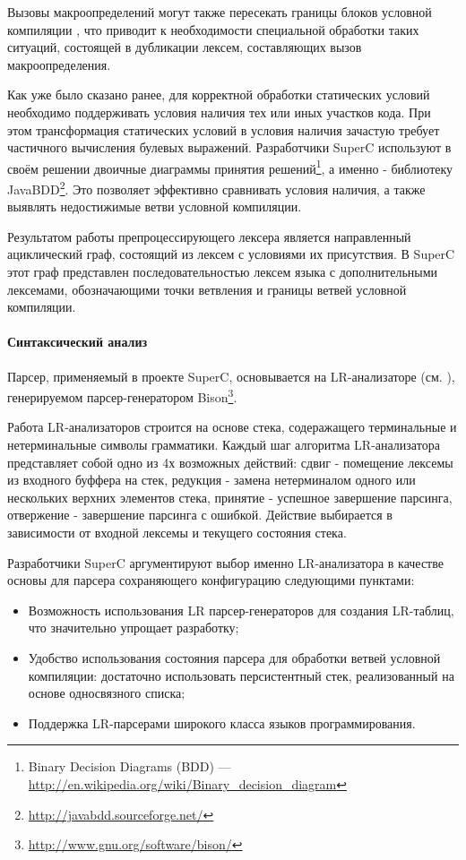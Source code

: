 Вызовы макроопределений могут также пересекать границы блоков условной компиляции , что приводит к необходимости специальной обработки таких ситуаций, состоящей в дубликации лексем, составляющих вызов макроопределения.

Как уже было сказано ранее, для корректной обработки статических условий необходимо поддерживать условия наличия тех или иных участков кода. При этом трансформация статических условий в условия наличия зачастую требует частичного вычисления булевых выражений. Разработчики SuperC используют в своём решении двоичные диаграммы принятия решений\footnote{Binary Decision Diagrams (BDD) --- \url{http://en.wikipedia.org/wiki/Binary\_decision\_diagram}}, а именно - библиотеку JavaBDD\footnote{\url{http://javabdd.sourceforge.net/}}. Это позволяет эффективно сравнивать условия наличия, а также выявлять недостижимые ветви условной компиляции. 

Результатом работы препроцессирующего лексера является направленный ациклический граф, состоящий из лексем с условиями их присутствия. В SuperC этот граф представлен последовательностью лексем языка с дополнительными лексемами, обозначающими точки ветвления и границы ветвей условной компиляции.

\paragraph{Синтаксический анализ}

Парсер, применяемый в проекте SuperC, основывается на LR-анализаторе (см. \cite{aho}), генерируемом парсер-генератором Bison\footnote{\url{http://www.gnu.org/software/bison/}}.

Работа LR-анализаторов строится на основе стека, содеражащего терминальные и нетерминальные символы грамматики. Каждый шаг алгоритма LR-анализатора представляет собой одно из 4х возможных действий: сдвиг - помещение лексемы из входного буффера на стек, редукция - замена нетерминалом одного или нескольких верхних элементов стека, принятие - успешное завершение парсинга, отвержение - завершение парсинга с ошибкой. Действие выбирается в зависимости от входной лексемы и текущего состояния стека.

Разработчики SuperC аргументируют выбор именно LR-анализатора в качестве основы для парсера сохраняющего конфигурацию следующими пунктами:

\begin{itemize}
\item Возможность использования LR парсер-генераторов для создания LR-таблиц, что значительно упрощает разработку;
\item Удобство использования состояния парсера для обработки ветвей условной компиляции: достаточно использовать персистентный стек, реализованный на основе односвязного списка;
\item Поддержка LR-парсерами широкого класса языков программирования.
\end{itemize}

